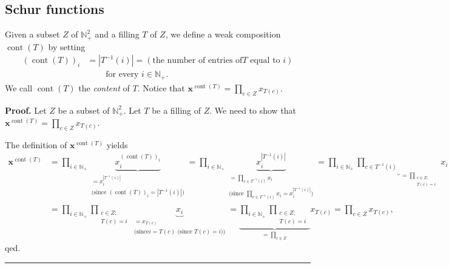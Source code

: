 \documentclass[numbers=enddot,12pt,final,onecolumn,notitlepage]{scrartcl}%
\theoremstyle{definition}
\newenvironment{proof}[1][Proof]{\noindent\textbf{#1.} }{\ \rule{0.5em}{0.5em}}
\newenvironment{verlong}{}{}
\let\prodnonlimits\prod
\renewcommand{\prod}{\prodnonlimits\limits}
\begin{document}
\subsection{Schur functions}

Given a subset $Z$ of $\mathbb{N}_{+}^{2}$ and a filling $T$ of $Z$, we define
a weak composition $\operatorname*{cont}\left(  T\right)  $ by setting%
\begin{align*}
\left(  \operatorname*{cont}\left(  T\right)  \right)  _{i}  &  =\left\vert
T^{-1}\left(  i\right)  \right\vert =\left(  \text{the number of entries of
}T\text{ equal to }i\right) \\
&  \ \ \ \ \ \ \ \ \ \ \text{for every }i\in\mathbb{N}_{+}.
\end{align*}
We call $\operatorname*{cont}\left(  T\right)  $ the \textit{content} of $T$.
Notice that $\mathbf{x}^{\operatorname*{cont}\left(  T\right)  }=\prod_{c\in
Z}x_{T\left(  c\right)  }$.

\begin{verlong}
\begin{proof}
Let $Z$ be a subset of $\mathbb{N}_{+}^{2}$. Let $T$ be a filling of $Z$. We
need to show that $\mathbf{x}^{\operatorname*{cont}\left(  T\right)  }%
=\prod_{c\in Z}x_{T\left(  c\right)  }$.

The definition of $\mathbf{x}^{\operatorname*{cont}\left(  T\right)  }$ yields%
\begin{align*}
\mathbf{x}^{\operatorname*{cont}\left(  T\right)  }  &  =\prod_{i\in
\mathbb{N}_{+}}\underbrace{x_{i}^{\left(  \operatorname*{cont}\left(
T\right)  \right)  _{i}}}_{\substack{=x_{i}^{\left\vert T^{-1}\left(
i\right)  \right\vert }\\\text{(since }\left(  \operatorname*{cont}\left(
T\right)  \right)  _{i}=\left\vert T^{-1}\left(  i\right)  \right\vert
\text{)}}}=\prod_{i\in\mathbb{N}_{+}}\underbrace{x_{i}^{\left\vert
T^{-1}\left(  i\right)  \right\vert }}_{\substack{=\prod_{c\in T^{-1}\left(
i\right)  }x_{i}\\\text{(since }\prod_{c\in T^{-1}\left(  i\right)  }%
x_{i}=x_{i}^{\left\vert T^{-1}\left(  i\right)  \right\vert }\text{)}}%
}=\prod_{i\in\mathbb{N}_{+}}\underbrace{\prod_{c\in T^{-1}\left(  i\right)  }%
}_{=\prod_{\substack{c\in Z;\\T\left(  c\right)  =i}}}x_{i}\\
&  =\prod_{i\in\mathbb{N}_{+}}\prod_{\substack{c\in Z;\\T\left(  c\right)
=i}}\underbrace{x_{i}}_{\substack{=x_{T\left(  c\right)  }\\\text{(since
}i=T\left(  c\right)  \text{ (since }T\left(  c\right)  =i\text{))}%
}}=\underbrace{\prod_{i\in\mathbb{N}_{+}}\prod_{\substack{c\in Z;\\T\left(
c\right)  =i}}}_{=\prod_{c\in Z}}x_{T\left(  c\right)  }=\prod_{c\in
Z}x_{T\left(  c\right)  },
\end{align*}
qed.
\end{proof}
\end{verlong}
\end{document}
